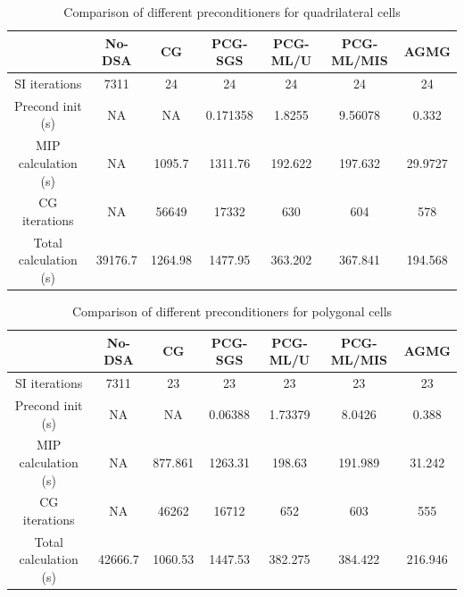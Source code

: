 %
%
\begin{table}[!htbp]
  \begin{center}
    \caption{Comparison of different preconditioners for quadrilateral cells}
    \begin{tabular}{|c|c|c|c|c|c|c|}
      \hline
      & No-DSA & CG & PCG-SGS & PCG-ML/U & PCG-ML/MIS & AGMG \\
      \hline
      SI iterations   & 7311    & 24      & 24       & 24      & 24      & 24 \\
   Precond init (s)   & NA      & NA      & 0.171358 & 1.8255  & 9.56078 & 0.332 \\
MIP calculation (s)   & NA      & 1095.7  & 1311.76  & 192.622 & 197.632 & 29.9727 \\
      CG iterations   & NA      & 56649   & 17332    & 630     & 604     & 578 \\
Total calculation (s) & 39176.7 & 1264.98 & 1477.95  & 363.202 & 367.841 &
      194.568 \\
      \hline
    \end{tabular}
    \label{comparison_homog_quad}
  \end{center}
\end{table}
%
\begin{table}[!htbp]
  \begin{center}
    \caption{Comparison of different preconditioners for polygonal cells}
    \begin{tabular}{|c|c|c|c|c|c|c|}
      \hline
      & No-DSA & CG & PCG-SGS & PCG-ML/U & PCG-ML/MIS & AGMG \\
      \hline
      SI iterations   & 7311    & 23      & 23      & 23      & 23      & 23 \\
   Precond init (s)   & NA      & NA      & 0.06388 & 1.73379 & 8.0426  & 0.388 \\
MIP calculation (s)   & NA      & 877.861 & 1263.31 & 198.63  & 191.989 &
      31.242 \\
      CG iterations   & NA      & 46262   & 16712   & 652     & 603     & 555 \\
Total calculation (s) & 42666.7 & 1060.53 & 1447.53 & 382.275 & 384.422 &
      216.946 \\
      \hline
    \end{tabular}
    \label{comparison_homog_poly}
  \end{center}
\end{table}

